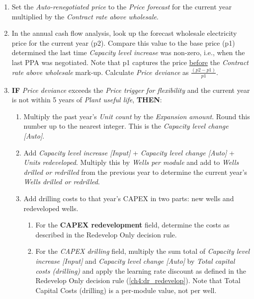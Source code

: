 \begin{enumerate}
    \item Set the \textit{Auto-renegotiated price} to the \textit{Price forecast} for the current year multiplied by the \textit{Contract rate above wholesale}.
    \item In the annual cash flow analysis, look up the forecast wholesale electricity price for the current year (p2). Compare this value to the base price (p1) determined the last time \textit{Capacity level increase} was non-zero, i.e., when the last PPA was negotiated. Note that p1 captures the price \underline{before} the \textit{Contract rate above wholesale} mark-up. Calculate \textit{Price deviance} as \(\frac{(p2-p1)}{p1}\). 
    \item \textbf{IF} \textit{Price deviance} exceeds the \textit{Price trigger for flexibility} and the current year is not within 5 years of \textit{Plant useful life}, \textbf{THEN}:
    \begin{enumerate}
        \item Multiply the past year’s \textit{Unit count} by the \textit{Expansion amount}. Round this number up to the nearest integer. This is the \textit{Capacity level change [Auto]}.
        \item Add \textit{Capacity level increase [Input]} + \textit{Capacity level change [Auto]} + \textit{Units redeveloped}. Multiply this by \textit{Wells per module} and add to \textit{Wells drilled or redrilled} from the previous year to determine the current year’s \textit{Wells drilled or redrilled}.
        \item Add drilling costs to that year’s CAPEX in two parts: new wells and redeveloped wells.
        \begin{enumerate}
            \item For the \textbf{CAPEX redevelopment} field, determine the costs as described in the Redevelop Only decision rule.
            \item For the \textit{CAPEX drilling} field, multiply the sum total of \textit{Capacity level increase [Input]} and \textit{Capacity level change [Auto]} by \textit{Total capital costs (drilling)} and apply the learning rate discount as defined in the Redevelop Only decision rule (\ref{ch4:dr_redevelop}). Note that Total Capital Costs (drilling) is a per-module value, not per well.
        \end{enumerate}
    \end{enumerate}
\end{enumerate}

